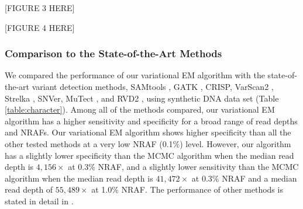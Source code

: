 \documentclass{bmcart}
\begin{document}
\vspace{2em}
\begin{center}
[FIGURE 3 HERE]  
\end{center}
\vspace{2em}

\vspace{2em}
\begin{center}
[FIGURE 4 HERE]  
\end{center}
\vspace{2em}

\subsubsection{Comparison to the State-of-the-Art Methods}
We compared the performance of our variational EM algorithm with the state-of-the-art variant detection methods, SAMtools \cite{li2009sequence}, GATK \cite{mckenna2010genome}, CRISP\cite{bansal2010statistical}, VarScan2 \cite{koboldt2012varscan}, Strelka \cite{saunders2012strelka}, SNVer\cite{wei2011snver}, MuTect \cite{cibulskis2013sensitive}, and RVD2 \cite{he2015rvd2}, using synthetic DNA data set (Table \ref{table:character}).
Among all of the methods compared, our variational EM algorithm has a higher sensitivity and specificity for a broad range of read depths and NRAFs.
Our variational EM algorithm shows higher specificity than all the other tested methods at a very low NRAF (0.1\%) level.
However, our algorithm has a slightly lower specificity than the MCMC algorithm when the median read depth is $4,156\times$ at 0.3\% NRAF, and a slightly lower sensitivity than the MCMC algorithm when the median read depth is $41,472\times$ at 0.3\% NRAF and a median read depth of $55,489\times$ at 1.0\% NRAF.
The performance of other methods is stated in detail in \cite{he2015rvd2}.
\end{document}
